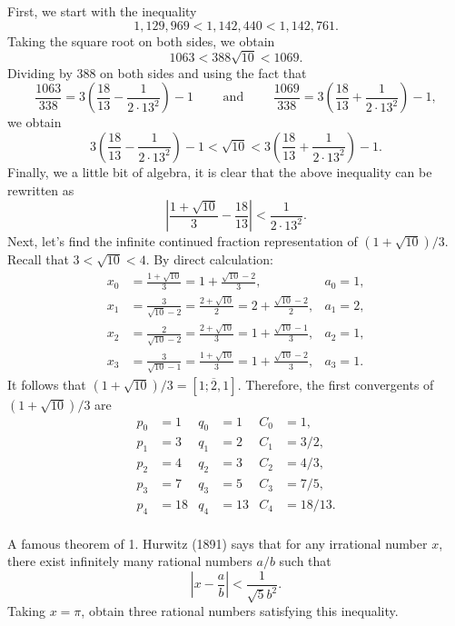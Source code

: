 \begin{solution}
    First, we start with the inequality
    $$1,129,969 < 1,142,440 < 1,142,761.$$
    Taking the square root on both sides, we obtain
    $$1063 < 388\sqrt{10} < 1069.$$
    Dividing by 388 on both sides and using the fact that
    $$\frac{1063}{338} = 3\left(\frac{18}{13} - \frac{1}{2\cdot 13^2}\right) - 1 \qquad \text{ and } \qquad \frac{1069}{338} = 3\left(\frac{18}{13} + \frac{1}{2\cdot 13^2}\right) - 1,$$
    we obtain
    $$3\left(\frac{18}{13} - \frac{1}{2\cdot 13^2}\right) - 1 < \sqrt{10} < 3\left(\frac{18}{13} + \frac{1}{2\cdot 13^2}\right) - 1.$$
    Finally, we a little bit of algebra, it is clear that the above inequality can be rewritten as
    $$\left|\frac{1 + \sqrt{10}}{3} - \frac{18}{13}\right| < \frac{1}{2\cdot 13^2}.$$
    Next, let's find the infinite continued fraction representation of $(1+ \sqrt{10})/3$. Recall that $3 < \sqrt{10} < 4$. By direct calculation:
    \begin{align*}
        x_0 &= \frac{1 + \sqrt{10}}{3} = 1 + \frac{\sqrt{10} - 2}{3}, & a_0 = 1, \\
        x_1 &= \frac{3}{\sqrt{10} - 2} = \frac{2+\sqrt{10}}{2} = 2 + \frac{\sqrt{10} - 2}{2}, & a_1 = 2, \\
        x_2 &= \frac{2}{\sqrt{10} - 2} = \frac{2 + \sqrt{10}}{3} = 1 + \frac{\sqrt{10} - 1}{3}, & a_2 = 1, \\
        x_3 &= \frac{3}{\sqrt{10} - 1} = \frac{1 + \sqrt{10}}{3} = 1 + \frac{\sqrt{10} - 2}{3}, & a_3 = 1.
    \end{align*}
    It follows that $(1+ \sqrt{10})/3 = [\overline{1; 2, 1}]$. Therefore, the first convergents of $(1+ \sqrt{10})/3$ are
    \begin{align*}
        p_0 &= 1 & q_0 &= 1 & C_0 &= 1, \\
        p_1 &= 3 & q_1 &= 2 & C_1 &= 3/2, \\
        p_2 &= 4 & q_2 &= 3 & C_2 &= 4/3, \\
        p_3 &= 7 & q_3 &= 5 & C_3 &= 7/5, \\
        p_4 &= 18 & q_4 &= 13 & C_4 &= 18/13. \\
    \end{align*}
\end{solution}

\begin{exercise}
    A famous theorem of 1. Hurwitz (1891) says that for any irrational number $x$, there exist infinitely many rational numbers $a/b$ such that 
    $$\left|x - \frac{a}{b}\right| < \frac{1}{\sqrt{5}b^2}.$$
    Taking $x = \pi$, obtain three rational numbers satisfying this inequality.\\
\end{exercise}

